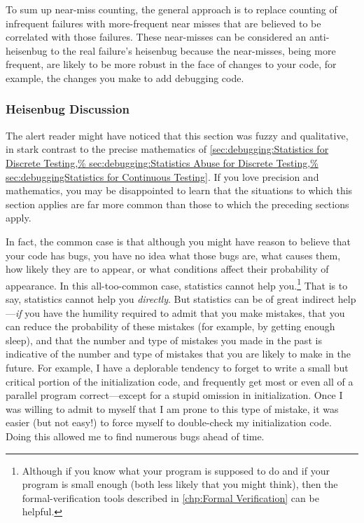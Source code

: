 To sum up near-miss counting, the general approach is to replace counting
of infrequent failures with more-frequent near misses that are believed
to be correlated with those failures.
These near-misses can be considered an anti-heisenbug to the real failure's
heisenbug because the near-misses, being more frequent, are likely to
be more robust in the face of changes to your code, for example, the
changes you make to add debugging code.

\subsubsection{Heisenbug Discussion}
\label{sec:debugging:Heisenbug Discussion}

The alert reader might have noticed that this section was fuzzy and
qualitative, in stark contrast to the precise mathematics of
\cref{sec:debugging:Statistics for Discrete Testing,%
sec:debugging:Statistics Abuse for Discrete Testing,%
sec:debuggingStatistics for Continuous Testing}.
If you love precision and mathematics, you may be disappointed to
learn that the situations to which this section applies are far
more common than those to which the preceding sections apply.

In fact, the common case is that although you might have reason to believe
that your code has bugs, you have no idea what those bugs are, what
causes them, how likely they are to appear, or what conditions affect
their probability of appearance.
In this all-too-common case, statistics cannot help you.\footnote{
	Although if you know what your program is supposed to do and
	if your program is small enough (both less likely that you
	might think), then the formal-verification tools described in
	\cref{chp:Formal Verification}
	can be helpful.}
That is to say, statistics cannot help you \emph{directly}.
But statistics can be of great indirect help---\emph{if} you have the
humility required to admit that you make mistakes, that you can reduce the
probability of these mistakes (for example, by getting enough sleep), and
that the number and type of mistakes you made in the past is indicative of
the number and type of mistakes that you are likely to make in the future.
For example, I have a deplorable tendency to forget to write a small
but critical portion of the initialization code, and frequently get most
or even all of a parallel program correct---except for a stupid
omission in initialization.
Once I was willing to admit to myself that I am prone to this type of
mistake, it was easier (but not easy!) to force myself to double-check
my initialization code.
Doing this allowed me to find numerous bugs ahead of time.

